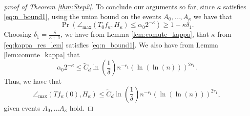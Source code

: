 \documentclass[12pt]{article}
\theoremstyle{remark}
\newcommand{\maxangle}{\angle_{\max}}
\begin{document}
\begin{proof}[proof of Theorem \ref{thm:Step2}]
	

	
	To conclude our arguments so far, since $\kappa$ satisfies \eqref{eq:n_bound1}, using the union bound on the events $A_0,\ldots, A_\kappa$  we have that 
	\begin{equation}\label{eq:final_prob_bound1}
		\Pr\left(\maxangle (T_0 f_{\kappa}, H_{\kappa}) \leq \alpha_0 2^{-\kappa}\right) \geq 1 -  \kappa\delta_1.        
	\end{equation}
	Choosing $\delta_1 = \frac{\delta}{\kappa+1}$, we have from Lemma \ref{lem:comute_kappa}, that $\kappa$ from \eqref{eq:kappa_res_lem} satisfies  \eqref{eq:n_bound1}. We also have from Lemma \ref{lem:comute_kappa} that 
	\[
	\alpha_0 2^{-\kappa} \leq \tilde C_{d} \ln\left(\frac{1}{\delta}\right) n^{-r_1}\left(\ln\left(\ln(n) \right)\right)^{2r_1}.
	\]
	Thus, we have that 
	\begin{equation}\label{eq:prob_ang_bound_Tfk_Hk}
		\maxangle (Tf_{\kappa}(0), H_{\kappa}) \leq \tilde C_{d}\ln\left(\frac{1}{\delta}\right) n^{-r_1}\left(\ln\left(\ln(n) \right)\right)^{2r_1},    
	\end{equation}
	given events $A_0,\ldots A_\kappa$ hold.

\end{proof}
\end{document}
